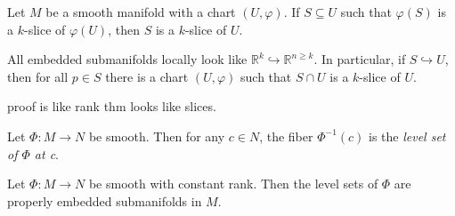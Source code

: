 \begin{definition}\label{2.1.7}
	Let $M$ be a smooth manifold with a chart $(U,\varphi )$. If $S\subseteq U$ such that $\varphi (S)$ is a $k$-slice of $\varphi (U)$, then $S$ is a $k$-slice of $U$.
\end{definition}

\begin{theorem}\label{2.1.8}
	All embedded submanifolds locally look like $\mathbb{R} ^k\hookrightarrow \mathbb{R} ^{n\geq k} $. In particular, if $S\hookrightarrow U$, then for all $p\in S$ there is a chart $(U,\varphi )$ such that $S \cap U$ is a $k$-slice of $U$.
\end{theorem}
proof is like rank thm looks like slices.

\begin{definition}\label{2.1.9}
	Let $\Phi : M \to N$ be smooth. Then for any $c\in N$, the fiber $\Phi ^{-1} (c)$ is the \emph{level set of $\Phi $ at c}.
\end{definition}

\begin{proposition}\label{2.1.10}
	Let $\Phi : M \to N$ be smooth with constant rank. Then the level sets of $\Phi $ are properly embedded submanifolds in $M$.
\end{proposition}


